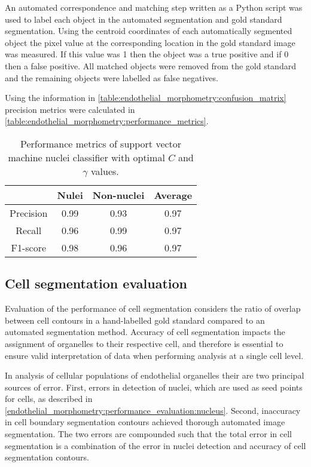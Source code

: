 An automated correspondence and matching step written as a Python script was used to label each object in the automated segmentation and gold standard segmentation. Using the centroid coordinates of each automatically segmented object the pixel value at the corresponding location in the gold standard image was measured. If this value was 1 then the object was a true positive and if 0 then a false positive. All matched objects were removed from the gold standard and the remaining objects were labelled as false negatives.

Using the information in \autoref{table:endothelial_morphometry:confusion_matrix} precision metrics were calculated in \autoref{table:endothelial_morphometry:performance_metrics}.

\begin{table}[htbp]
\caption[Performance metrics of support vector machine nuclei classification]{Performance metrics of support vector machine nuclei classifier with optimal $C$ and $\gamma$ values.}
\centering
\label{table:endothelial_morphometry:performance_metrics}
\begin{tabular}{c c c c}
	\toprule
	& Nulei & Non-nuclei & Average\\
	\midrule
	Precision & 0.99 & 0.93 & 0.97 \\
	Recall    & 0.96 & 0.99 & 0.97 \\
	F1-score  & 0.98 & 0.96 & 0.97 \\
	\bottomrule
\end{tabular}
\end{table}

\subsection{Cell segmentation evaluation}
\label{endothelial_morphometry:performance_evaluation:cell}
Evaluation of the performance of cell segmentation considers the ratio of overlap between cell contours in a hand-labelled gold standard compared to an automated segmentation method. Accuracy of cell segmentation impacts the assignment of organelles to their respective cell, and therefore is essential to ensure valid interpretation of data when performing analysis at a single cell level.

In analysis of cellular populations of endothelial organelles their are two principal sources of error. First, errors in detection of nuclei, which are used as seed points for cells, as described in \autoref{endothelial_morphometry:performance_evaluation:nucleus}. Second, inaccuracy in cell boundary segmentation contours achieved thorough automated image segmentation. The two errors are compounded such that the total error in cell segmentation is a combination of the error in nuclei detection and accuracy of cell segmentation contours.

